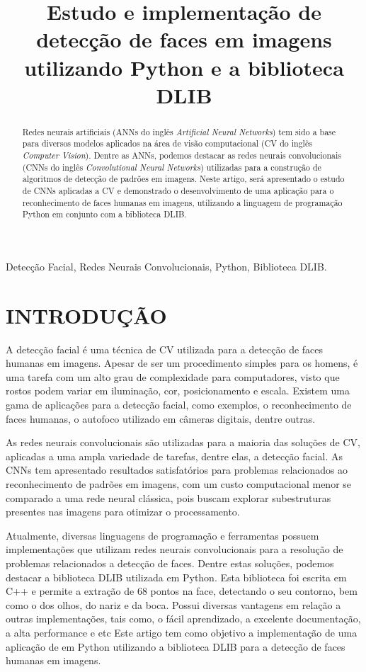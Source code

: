 \documentclass[conference]{IEEEtran}
\title{Estudo e implementação de detecção de faces em imagens utilizando Python e a biblioteca DLIB}
\author{
    \IEEEauthorblockN{José B. M. Trineto \\ Werberson P. da Silva}
    \IEEEauthorblockA{
        \textit{Universidade de Brasília - Departamento de Engenharia Elétrica}
    }
}
\begin{document}
    \maketitle
    
    \begin{abstract}
        Redes neurais artificiais (ANNs do inglês \textit{Artificial Neural Networks}) tem sido a base para diversos modelos aplicados na área de visão computacional (CV do inglês \textit{Computer Vision}). Dentre as ANNs, podemos destacar as redes neurais convolucionais (CNNs do inglês \textit{Convolutional Neural Networks}) utilizadas para a construção de algoritmos de detecção de padrões em imagens. Neste artigo, será apresentado o estudo de CNNs aplicadas a CV e demonstrado o desenvolvimento de uma aplicação para o reconhecimento de faces humanas em imagens, utilizando a linguagem de programação Python em conjunto com a biblioteca DLIB. 
    \end{abstract}
    
    \begin{IEEEkeywords}
     	  Detecção Facial, Redes Neurais Convolucionais, Python, Biblioteca DLIB.
	 \end{IEEEkeywords}
	
    \section{INTRODUÇÃO}
		A detecção facial é uma técnica de CV utilizada para a detecção de faces humanas em imagens.	Apesar de ser um procedimento simples para os homens, é uma tarefa com um alto grau de complexidade para computadores, visto que rostos podem variar em iluminação, cor, posicionamento e escala. Existem uma gama de aplicações para a detecção facial, como exemplos, o reconhecimento de faces humanas, o autofoco utilizado em câmeras digitais, dentre outras.
		
	    As redes neurais convolucionais são utilizadas para a maioria das soluções de CV, aplicadas a uma ampla variedade de tarefas, dentre elas, a detecção facial. As CNNs tem apresentado resultados satisfatórios para problemas relacionados ao reconhecimento de padrões em imagens, com um custo computacional menor se comparado a uma rede neural clássica, pois buscam explorar subestruturas presentes nas imagens para otimizar o processamento.
	    
		Atualmente, diversas linguagens de programação e ferramentas possuem implementações que utilizam redes neurais convolucionais para a resolução de problemas relacionados a detecção de faces. Dentre estas soluções, podemos destacar a biblioteca DLIB utilizada em Python. Esta biblioteca foi escrita em C++ e permite a extração de 68 pontos na face, detectando o seu contorno, bem como o dos olhos, do nariz e da boca. Possui diversas vantagens em relação a outras implementações, tais como, o fácil aprendizado, a excelente documentação, a alta performance e etc Este artigo tem como objetivo a implementação de uma aplicação de em Python utilizando a biblioteca DLIB para a detecção de faces humanas em imagens.
		
\end{document}

